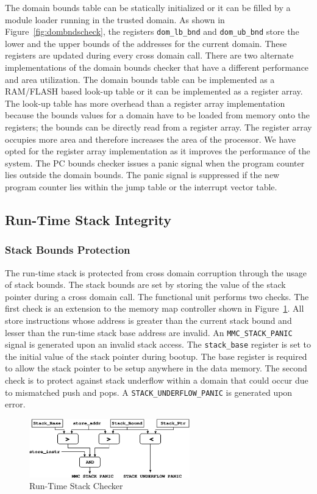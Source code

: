 The domain bounds table can be statically initialized or it
can be filled by a module loader running in the trusted domain.
%
As shown in Figure~\ref{fig:dombndscheck}, the registers
\texttt{dom\_lb\_bnd} and \texttt{dom\_ub\_bnd} store the lower and the
upper bounds of the addresses for the current domain.
%
These registers are updated during every cross domain call.
%
There are two alternate implementations of the domain bounds checker
that have a different performance and area utilization.
%
The domain bounds table can be implemented as a RAM/FLASH based
look-up table or it can be implemented as a register array.
%
The look-up table has more overhead than a register array
implementation because the bounds values for a domain have to be
loaded from memory onto the registers; the bounds can be directly read
from a register array.
%
The register array occupies more area and therefore increases the area
of the processor.
%
We have opted for the register array implementation as it improves the
performance of the system.
%
The PC bounds checker issues a panic signal when the program counter
lies outside the domain bounds.
%
The panic signal is suppressed if the new program counter lies within
the jump table or the interrupt vector table.
%
\subsection{Run-Time Stack Integrity}
\label{sec:umpuruntimestackprot}
\subsubsection{Stack Bounds Protection}
The run-time stack is protected from cross domain corruption through
the usage of stack bounds.
%
The stack bounds are set by storing the value of the stack pointer
during a cross domain call.
%
The functional unit performs two checks.
%
The first check is an extension to the memory map controller shown in
Figure~\ref{fig:stackbndscheck}.
%
All store instructions whose address is greater than the current stack
bound and lesser than the run-time stack base address are invalid.
%
An \texttt{MMC\_STACK\_PANIC} signal is generated upon an invalid stack
access.
%
The \texttt{stack\_base} register is set to the initial value
of the stack pointer during bootup.
%
The base register is required to allow the stack pointer to be setup
anywhere in the data memory.
%
The second check is to protect against stack underflow within a domain
that could occur due to mismatched push and pops.
%
A \texttt{STACK\_UNDERFLOW\_PANIC} is generated upon error.
%
\begin{figure}[htbp]
  \centering
  \includegraphics[height=1in,
  keepaspectratio=true]{figures/umpustackprot.eps} 
  \caption{Run-Time Stack Checker}
  \label{fig:stackbndscheck}
\end{figure}
%
